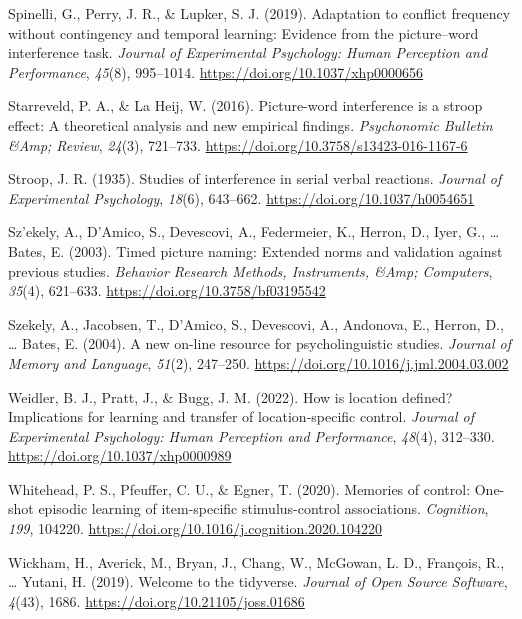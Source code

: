\documentclass[
  ,man,floatsintext]{apa6}
\newlength{\cslhangindent}
\newlength{\cslentryspacingunit} %
\newenvironment{CSLReferences}[2] %
 {%
  \setlength{\parindent}{0pt}
  \ifodd #1
  \let\oldpar\par
  \def\par{\hangindent=\cslhangindent\oldpar}
  \fi
  \setlength{\parskip}{#2\cslentryspacingunit}
 }%
 {}
\begin{document}
\begin{CSLReferences}{1}{0}
\leavevmode{}%
Spinelli, G., Perry, J. R., \& Lupker, S. J. (2019). Adaptation to conflict frequency without contingency and temporal learning: Evidence from the picture--word interference task. \emph{Journal of Experimental Psychology: Human Perception and Performance}, \emph{45}(8), 995--1014. \url{https://doi.org/10.1037/xhp0000656}

\leavevmode{}%
Starreveld, P. A., \& La Heij, W. (2016). Picture-word interference is a stroop effect: A theoretical analysis and new empirical findings. \emph{Psychonomic Bulletin \&Amp; Review}, \emph{24}(3), 721--733. \url{https://doi.org/10.3758/s13423-016-1167-6}

\leavevmode{}%
Stroop, J. R. (1935). Studies of interference in serial verbal reactions. \emph{Journal of Experimental Psychology}, \emph{18}(6), 643--662. \url{https://doi.org/10.1037/h0054651}

\leavevmode{}%
Sz'ekely, A., D'Amico, S., Devescovi, A., Federmeier, K., Herron, D., Iyer, G., \ldots{} Bates, E. (2003). Timed picture naming: Extended norms and validation against previous studies. \emph{Behavior Research Methods, Instruments, \&Amp; Computers}, \emph{35}(4), 621--633. \url{https://doi.org/10.3758/bf03195542}

\leavevmode{}%
Szekely, A., Jacobsen, T., D'Amico, S., Devescovi, A., Andonova, E., Herron, D., \ldots{} Bates, E. (2004). A new on-line resource for psycholinguistic studies. \emph{Journal of Memory and Language}, \emph{51}(2), 247--250. \url{https://doi.org/10.1016/j.jml.2004.03.002}

\leavevmode{}%
Weidler, B. J., Pratt, J., \& Bugg, J. M. (2022). How is location defined? Implications for learning and transfer of location-specific control. \emph{Journal of Experimental Psychology: Human Perception and Performance}, \emph{48}(4), 312--330. \url{https://doi.org/10.1037/xhp0000989}

\leavevmode{}%
Whitehead, P. S., Pfeuffer, C. U., \& Egner, T. (2020). Memories of control: One-shot episodic learning of item-specific stimulus-control associations. \emph{Cognition}, \emph{199}, 104220. \url{https://doi.org/10.1016/j.cognition.2020.104220}

\leavevmode{}%
Wickham, H., Averick, M., Bryan, J., Chang, W., McGowan, L. D., François, R., \ldots{} Yutani, H. (2019). Welcome to the {tidyverse}. \emph{Journal of Open Source Software}, \emph{4}(43), 1686. \url{https://doi.org/10.21105/joss.01686}


\end{CSLReferences}
\end{document}
